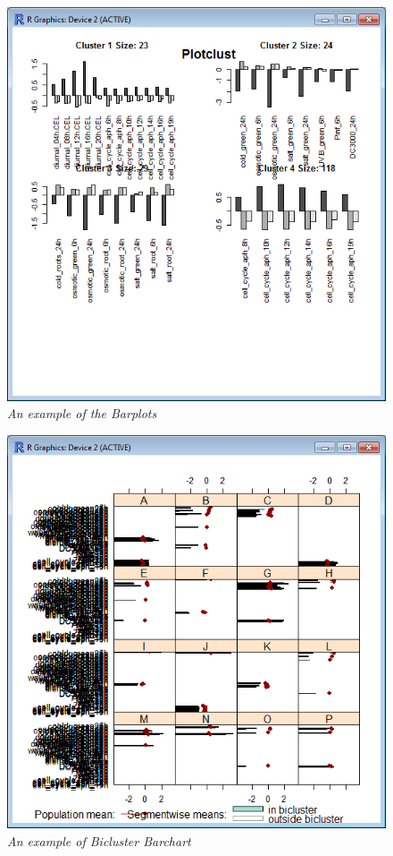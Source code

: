 \documentclass[a4paper]{article}\usepackage[]{graphicx}\usepackage[]{color}
\begin{document}
\begin{figure}[H]
\centering
\includegraphics[scale=0.4]{figures/biclustplot_example6.png}
\caption{{\it An example of the Barplots}\label{biclustplot_example6}}
\end{figure}
\begin{figure}[H]
\centering
\includegraphics[scale=0.4]{figures/biclustplot_example7.png}
\caption{{\it An example of Bicluster Barchart}\label{biclustplot_example7}}
\end{figure}
\end{document}
